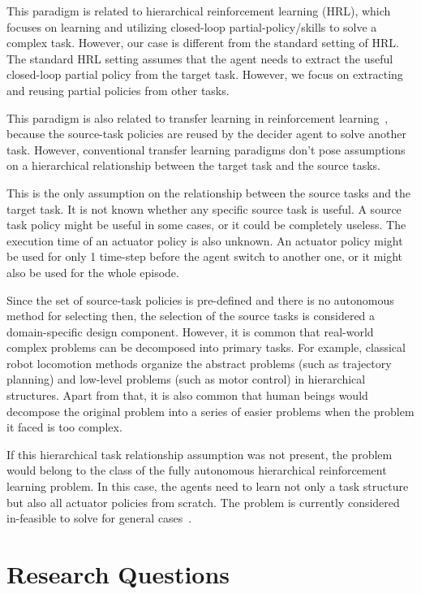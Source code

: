 This paradigm is related to hierarchical reinforcement learning (HRL), which focuses on learning and utilizing closed-loop partial-policy/skills to solve a complex task. However, our case is different from the standard setting of HRL. The standard HRL setting assumes that the agent needs to extract the useful closed-loop partial policy from the target task. However, we focus on extracting and reusing partial policies from other tasks.

This paradigm is also related to transfer learning in reinforcement learning~\cite{taylor2009transfer}, because the source-task policies are reused by the decider agent to solve another task. However, conventional transfer learning paradigms don't pose assumptions on a hierarchical relationship between the target task and the source tasks.

This is the only assumption on the relationship between the source tasks and the target task. It is not known whether any specific source task is useful. A source task policy might be useful in some cases, or it could be completely useless. The execution time of an actuator policy is also unknown. An actuator policy might be used for only 1 time-step before the agent switch to another one, or it might also be used for the whole episode.

Since the set of source-task policies is pre-defined and there is no autonomous method for selecting then, the selection of the source tasks is considered a domain-specific design component. However, it is common that real-world complex problems can be decomposed into primary tasks. For example, classical robot locomotion methods organize the abstract problems (such as trajectory planning) and low-level problems (such as motor control) in hierarchical structures. Apart from that, it is also common that human beings would decompose the original problem into a series of easier problems when the problem it faced is too complex.

If this hierarchical task relationship assumption was not present, the problem would belong to the class of the fully autonomous hierarchical reinforcement learning problem. In this case, the agents need to learn not only a task structure but also all actuator policies from scratch. The problem is currently considered in-feasible to solve for general cases~\cite{barto2003recent}.


\section{Research Questions}


